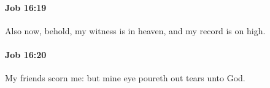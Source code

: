 		\paragraph{Job 16:19} %
			\label{JOB-16-19}

			Also now, behold, my witness is in heaven, and my record is on high.


		\paragraph{Job 16:20} %
			\label{JOB-16-20}

			My friends scorn me: but mine eye poureth out tears unto God.


